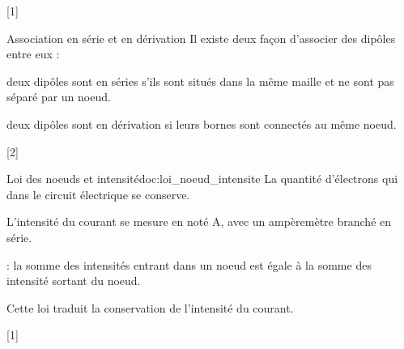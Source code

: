 [1]


\begin{doc}{Association en série et en dérivation}
  Il existe deux façon d'associer des dipôles entre eux :
  \begin{listePoints}
    \item deux dipôles sont en séries s'ils sont situés dans la même maille et ne sont pas séparé par un noeud.
    \item deux dipôles sont en dérivation si leurs bornes sont connectés au même noeud.
  \end{listePoints}
\end{doc}

\pasCorrection{\newpage\vspace*{-28pt}}
[2]


\begin{doc}{Loi des noeuds et intensité}{doc:loi_noeud_intensite}
  \chevron La quantité d'électrons qui  dans le circuit électrique se conserve.
  \begin{importants}
    L'intensité du courant se mesure en  noté A, avec un ampèremètre branché en série.
  \end{importants}
  \begin{importants}
     : la somme des intensités entrant dans un noeud est égale à la somme des intensité sortant du noeud.
  \end{importants}
  Cette loi traduit la conservation de l'intensité du courant.
\end{doc}

[1]



